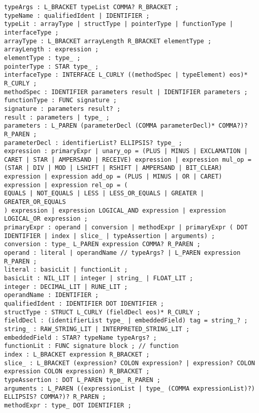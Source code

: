 \begin{lstlisting}[basicstyle=\scriptsize,caption={Описание синтаксического анализатора}]
typeArgs : L_BRACKET typeList COMMA? R_BRACKET ;
typeName : qualifiedIdent | IDENTIFIER ;
typeLit : arrayType | structType | pointerType | functionType | interfaceType ;
arrayType : L_BRACKET arrayLength R_BRACKET elementType ;
arrayLength : expression ;
elementType : type_ ;
pointerType : STAR type_ ;
interfaceType : INTERFACE L_CURLY ((methodSpec | typeElement) eos)* R_CURLY ;
methodSpec : IDENTIFIER parameters result | IDENTIFIER parameters ;
functionType : FUNC signature ;
signature : parameters result? ;
result : parameters | type_ ;
parameters : L_PAREN (parameterDecl (COMMA parameterDecl)* COMMA?)? R_PAREN ;
parameterDecl : identifierList? ELLIPSIS? type_ ;
expression : primaryExpr | unary_op = (PLUS | MINUS | EXCLAMATION | CARET | STAR | AMPERSAND | RECEIVE) expression | expression mul_op = (STAR | DIV | MOD | LSHIFT | RSHIFT | AMPERSAND | BIT_CLEAR) expression | expression add_op = (PLUS | MINUS | OR | CARET) expression | expression rel_op = (
EQUALS | NOT_EQUALS | LESS | LESS_OR_EQUALS | GREATER | GREATER_OR_EQUALS
) expression | expression LOGICAL_AND expression | expression LOGICAL_OR expression ;
primaryExpr : operand | conversion | methodExpr | primaryExpr ( DOT IDENTIFIER | index | slice_ | typeAssertion | arguments) ;
conversion : type_ L_PAREN expression COMMA? R_PAREN ;
operand : literal | operandName // typeArgs? | L_PAREN expression R_PAREN ;
literal : basicLit | functionLit ;
basicLit : NIL_LIT | integer | string_ | FLOAT_LIT ;
integer : DECIMAL_LIT | RUNE_LIT ;
operandName : IDENTIFIER ;
qualifiedIdent : IDENTIFIER DOT IDENTIFIER ;
structType : STRUCT L_CURLY (fieldDecl eos)* R_CURLY ;
fieldDecl : (identifierList type_ | embeddedField) tag = string_? ;
string_ : RAW_STRING_LIT | INTERPRETED_STRING_LIT ;
embeddedField : STAR? typeName typeArgs? ;
functionLit : FUNC signature block ; // function
index : L_BRACKET expression R_BRACKET ;
slice_ : L_BRACKET (expression? COLON expression? | expression? COLON expression COLON expression) R_BRACKET ;
typeAssertion : DOT L_PAREN type_ R_PAREN ;
arguments : L_PAREN ((expressionList | type_ (COMMA expressionList)?) ELLIPSIS? COMMA?)? R_PAREN ;
methodExpr : type_ DOT IDENTIFIER ;
\end{lstlisting}
